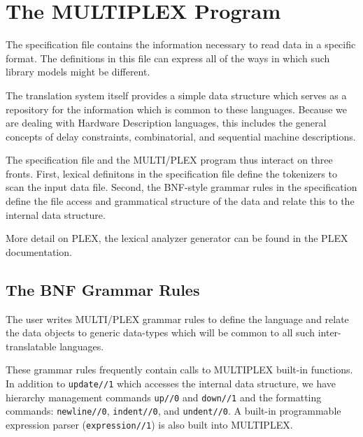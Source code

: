 \section{The MULTIPLEX Program}

The specification file contains the information necessary
to read data in a specific format.
The definitions in this file can express all of the
ways in which such library models might be different.

The translation system itself provides a simple
data structure which serves as a repository for the
information which is common to these languages. Because
we are dealing with Hardware Description languages,
this includes the general concepts of delay constraints,
combinatorial, and sequential machine descriptions.

The specification file and the MULTI/PLEX program thus
interact on three fronts. First, lexical definitons
in the specification file define the tokenizers to
scan the input data file. Second, the BNF-style
grammar rules in the specification define the
file access and grammatical structure of the data
and relate this to the internal data structure.

More detail on PLEX, the lexical analyzer generator
can be found in the PLEX documentation.

\subsection{The BNF Grammar Rules}

The user writes MULTI/PLEX grammar rules to 
define the language and relate the
data objects to generic data-types which will be
common to all such inter-translatable languages.

These grammar rules frequently contain calls to 
MULTIPLEX built-in functions. In addition to
{\tt update//1} which accesses the internal
data structure, we have hierarchy management
commands {\tt up//0} and {\tt down//1} and the
formatting commands: {\tt newline//0}, {\tt indent//0},
and {\tt undent//0}. A built-in programmable expression
parser ({\tt expression//1}) is also built into MULTIPLEX.

